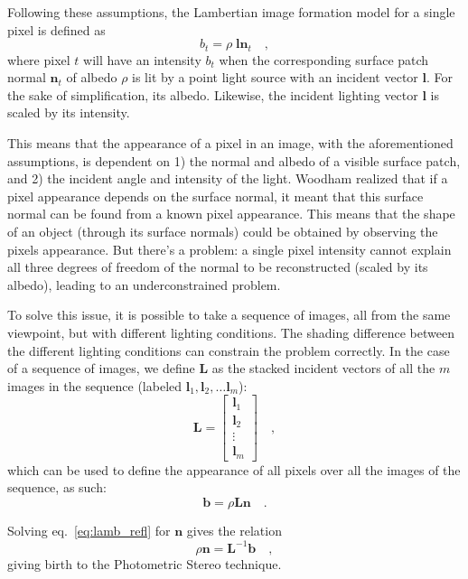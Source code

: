 Following these assumptions, the Lambertian image formation model for a single pixel is defined as
\begin{equation}
b_t =  \rho \; \mathbf{l} \mathbf{n}_t \quad,
\end{equation}
where pixel $t$ will have an intensity $b_t$ when the corresponding surface patch normal $\mathbf{n}_t$ of albedo $\rho$ is lit by a point light source with an incident vector $\mathbf{l}$. For the sake of simplification, its albedo. Likewise, the incident lighting vector $\mathbf{l}$ is scaled by its intensity.

This means that the appearance of a pixel in an image, with the aforementioned assumptions, is dependent on 1) the normal and albedo of a visible surface patch, and 2) the incident angle and intensity of the light. Woodham realized that if a pixel appearance depends on the surface normal, it meant that this surface normal can be found from a known pixel appearance. This means that the shape of an object (through its surface normals) could be obtained by observing the pixels appearance. But there's a problem: a single pixel intensity cannot explain all three degrees of freedom of the normal to be reconstructed (scaled by its albedo), leading to an underconstrained problem.

To solve this issue, it is possible to take a sequence of images, all from the same viewpoint, but with different lighting conditions. The shading difference between the different lighting conditions can constrain the problem correctly. In the case of a sequence of images, we define $\mathbf{L}$ as the stacked incident vectors of all the $m$ images in the sequence (labeled $\mathbf{l}_{1}, \mathbf{l}_{2}, \dots \mathbf{l}_{m}$):
\begin{equation}
\mathbf{L} =
\begin{bmatrix}
    \mathbf{l}_{1} \\
    \mathbf{l}_{2} \\
    \vdots \\
    \mathbf{l}_{m}
\end{bmatrix}
\quad,
\end{equation}
which can be used to define the appearance of all pixels over all the images of the sequence, as such:
\begin{equation}
\label{eq:lamb_refl}
\mathbf{b} =  \rho \mathbf{L} \mathbf{n} \quad.
\end{equation}

Solving eq.~\eqref{eq:lamb_refl} for $\mathbf{n}$ gives the relation
\begin{equation}
\label{eq:original_form}
\rho \mathbf{n} =  \mathbf{L}^{-1} \mathbf{b} \quad,
\end{equation}
giving birth to the Photometric Stereo technique.

